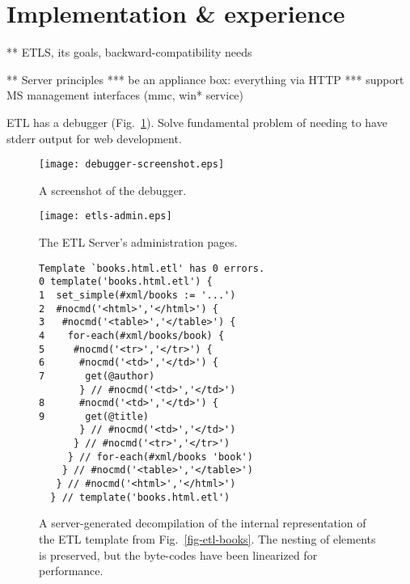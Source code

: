 \documentclass{www2003-submission}
\newcommand{\figref}[1]{Fig.~\ref{fig-#1}}
\begin{document}
\section{Implementation \& experience}

** ETLS, its goals, backward-compatibility needs

** Server principles
*** be an appliance box: everything via HTTP
*** support MS management interfaces (mmc, win* service)

ETL has a debugger (\figref{debugger-screenshot}).  Solve fundamental
problem of needing to have stderr output for web development.


\begin{figure}[tb]
\begin{centering}
\hspace*{-0.07\linewidth}\texttt{[image: debugger-screenshot.eps]}
\caption{A screenshot of the debugger.
\label{fig-debugger-screenshot}}
\end{centering}
\end{figure}


\begin{figure}[tb]
\begin{centering}
\hspace*{-0.05\linewidth}\texttt{[image: etls-admin.eps]}
\caption{The ETL Server's administration pages.
\label{fig-etls-admin}}
\end{centering}
\end{figure}



\begin{figure}[htbp]
\begin{verbatim}
Template `books.html.etl' has 0 errors.
0 template('books.html.etl') {
1  set_simple(#xml/books := '...')
2  #nocmd('<html>','</html>') {
3   #nocmd('<table>','</table>') {
4    for-each(#xml/books/book) {
5     #nocmd('<tr>','</tr>') {
6      #nocmd('<td>','</td>') {
7       get(@author)
       } // #nocmd('<td>','</td>')
8      #nocmd('<td>','</td>') {
9       get(@title)
       } // #nocmd('<td>','</td>')
      } // #nocmd('<tr>','</tr>')
     } // for-each(#xml/books 'book')
    } // #nocmd('<table>','</table>')
   } // #nocmd('<html>','</html>')
  } // template('books.html.etl')
\end{verbatim}%
\caption{A server-generated decompilation of the internal representation
of the ETL template from \figref{etl-books}.  The nesting of elements
is preserved, but the byte-codes have been linearized for performance.
\label{fig-etl-decompile}}
\end{figure}
\end{document}

